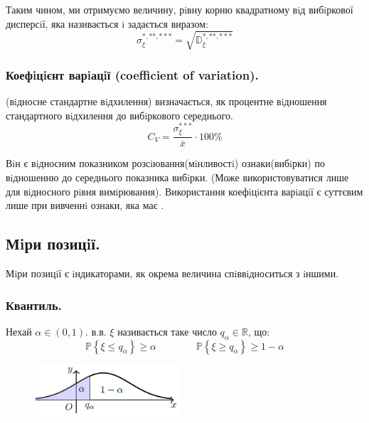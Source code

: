 Таким чином, ми отримуємо величину, рiвну корню квадратному вiд вибiркової дисперсiї, яка називається  i задається виразом:
$$
\sigma_{\xi}^{*, **, ***} = \sqrt{\mathbb{D}_{\xi}^{*, **, ***}}
$$
\subsubsection{Коефiцiєнт варiацiї (coefficient of variation).}
 (вiдносне стандартне вiдхилення) визначається, як процентне вiдношення стандартного вiдхилення до вибiркового середнього.
$$
C_V = \frac{\sigma^{***}_{\xi}}{\overline{x}} \cdot 100\%
$$
\begin{remark}
Вiн є вiдносним показником розсiювання(мiнливостi) ознаки(вибiрки) по вiдношенню до середнього показника вибiрки. (Може використовуватися лише для вiдносного рiвня вимiрювання).
Використання коефiцiєнта варiацiї є суттєвим лише при вивченнi ознаки, яка має .
\end{remark}
\newpage
\subsection{Мiри позицiї.}
Мiри позицiї є iндикаторами, як окрема величина спiввiдноситься з iншими.
\subsubsection{Квантиль.}
  Нехай $\alpha \in (0,1)$.  в.в. $\xi$ називається
таке число $q_{\alpha} \in \mathbb{R}$, що:
$$
\mathbb{P} \left\lbrace \xi \leq q_{\alpha} \right\rbrace \geq \alpha \qquad \qquad \mathbb{P} \left\lbrace \xi\geq q_{\alpha} \right\rbrace \geq 1 - \alpha
$$
\begin{figure}
\vspace*{-2em}
\centering
\includegraphics[width=0.48\textwidth]{assets/lectures_part_5-94f6ab31.png}
\end{figure}


